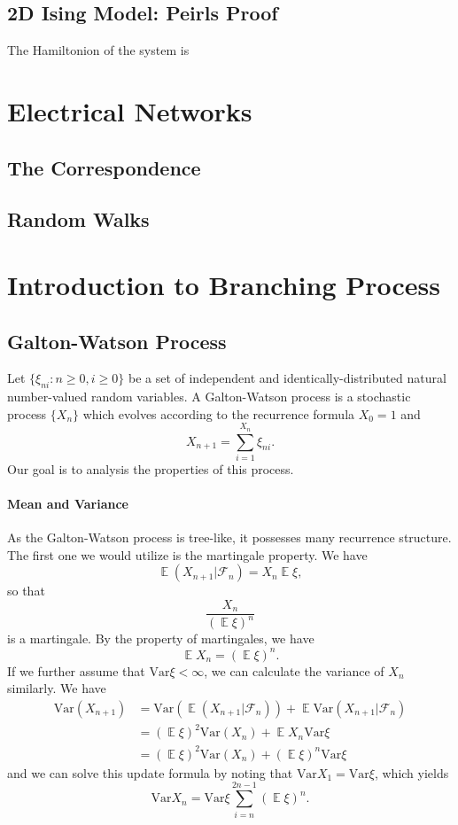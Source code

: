 \documentclass{article}
\theoremstyle{definition}
\newcommand{\EE}{\operatorname{\mathbb{E}}}
\newcommand{\cF}{\mathcal{F}}
\newcommand{\var}{\text{Var}}
\begin{document}
\subsection{2D Ising Model: Peirls Proof}
The Hamiltonion of the system is 
\[ \]






\section{Electrical Networks}
\subsection{The Correspondence}

\subsection{Random Walks}



\section{Introduction to Branching Process}
\subsection{Galton-Watson Process}
Let $\{\xi_{ni}:n\geq 0,i\geq 0\}$ be a set of independent and identically-distributed natural number-valued random variables.
A Galton-Watson process is a stochastic process $\{X_n\}$ which evolves according to the recurrence formula $X_0 = 1$ and 
\[ X_{n+1}=\sum_{i=1}^{X_n}\xi_{ni}.\]
Our goal is to analysis the properties of this process.

\paragraph{Mean and Variance} As the Galton-Watson process is tree-like, it possesses many recurrence structure.
The first one we would utilize is the martingale property. We have 
\[\EE(X_{n+1}|\cF_n)=X_n\EE \xi ,\]
so that \[\frac{X_n}{(\EE \xi)^n}\]
is a martingale. By the property of martingales, we have 
\[\EE X_{n}=(\EE \xi)^n.\]
If we further assume that $\var \xi<\infty$, we can calculate the variance of $X_n$ similarly. 
We have
\begin{align*}
    \var (X_{n+1}) &= \var (\EE(X_{n+1}|\cF_n))+\EE \var(X_{n+1}|\cF_n)\\
    &=(\EE \xi)^2\var(X_n)+\EE X_n \var \xi\\
    &=(\EE \xi)^2\var(X_n)+(\EE \xi)^n \var \xi
\end{align*}
and we can solve this update formula by noting that $\var X_{1}=\var \xi $, which yields
\[\var X_{n}=\var \xi \sum_{i=n}^{2n-1} (\EE \xi)^n.\]
\end{document}
